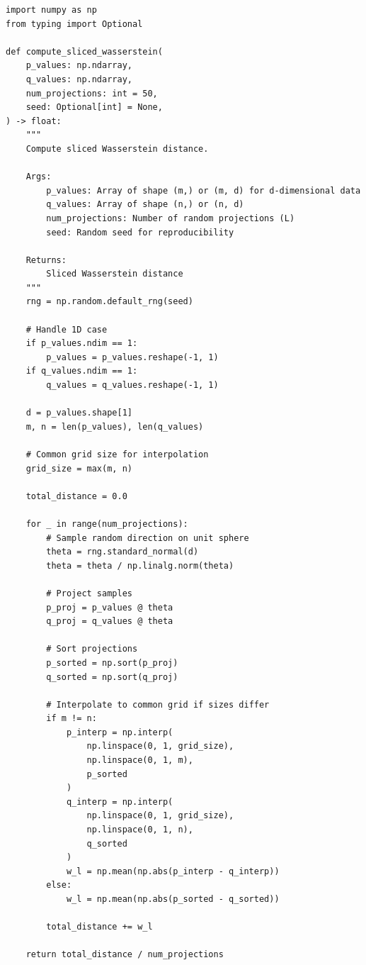 \begin{lstlisting}[language=jsonx,caption={Sliced Wasserstein implementation}]
import numpy as np
from typing import Optional

def compute_sliced_wasserstein(
    p_values: np.ndarray,
    q_values: np.ndarray,
    num_projections: int = 50,
    seed: Optional[int] = None,
) -> float:
    """
    Compute sliced Wasserstein distance.
    
    Args:
        p_values: Array of shape (m,) or (m, d) for d-dimensional data
        q_values: Array of shape (n,) or (n, d)
        num_projections: Number of random projections (L)
        seed: Random seed for reproducibility
        
    Returns:
        Sliced Wasserstein distance
    """
    rng = np.random.default_rng(seed)
    
    # Handle 1D case
    if p_values.ndim == 1:
        p_values = p_values.reshape(-1, 1)
    if q_values.ndim == 1:
        q_values = q_values.reshape(-1, 1)
    
    d = p_values.shape[1]
    m, n = len(p_values), len(q_values)
    
    # Common grid size for interpolation
    grid_size = max(m, n)
    
    total_distance = 0.0
    
    for _ in range(num_projections):
        # Sample random direction on unit sphere
        theta = rng.standard_normal(d)
        theta = theta / np.linalg.norm(theta)
        
        # Project samples
        p_proj = p_values @ theta
        q_proj = q_values @ theta
        
        # Sort projections
        p_sorted = np.sort(p_proj)
        q_sorted = np.sort(q_proj)
        
        # Interpolate to common grid if sizes differ
        if m != n:
            p_interp = np.interp(
                np.linspace(0, 1, grid_size),
                np.linspace(0, 1, m),
                p_sorted
            )
            q_interp = np.interp(
                np.linspace(0, 1, grid_size),
                np.linspace(0, 1, n),
                q_sorted
            )
            w_l = np.mean(np.abs(p_interp - q_interp))
        else:
            w_l = np.mean(np.abs(p_sorted - q_sorted))
        
        total_distance += w_l
    
    return total_distance / num_projections
\end{lstlisting}

